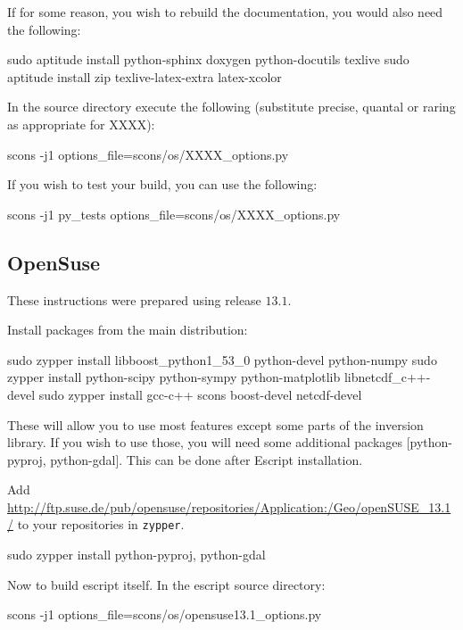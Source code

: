 \begin{optionalstep}
If for some reason, you wish to rebuild the documentation, you would also need the following:
\begin{shellCode}
sudo aptitude install python-sphinx doxygen python-docutils texlive 
sudo aptitude install zip texlive-latex-extra latex-xcolor 
\end{shellCode}
\end{optionalstep}

\noindent In the source directory execute the following (substitute precise, quantal or raring as appropriate for XXXX):
\begin{shellCode}
scons -j1 options_file=scons/os/XXXX_options.py
\end{shellCode}

\noindent If you wish to test your build, you can use the following:
\begin{shellCode}
scons -j1 py_tests options_file=scons/os/XXXX_options.py 
\end{shellCode}



\subsection{OpenSuse}\label{sec:susesrc}
These instructions were prepared using release $13.1$.

\noindent Install packages from the main distribution:
\begin{shellCode}
sudo zypper install libboost_python1_53_0 python-devel python-numpy 
sudo zypper install python-scipy python-sympy python-matplotlib libnetcdf_c++-devel
sudo zypper install gcc-c++ scons boost-devel netcdf-devel
\end{shellCode}
These will allow you to use most features except some parts of the \downunder inversion library.
If you wish to use those, you will need some additional packages [python-pyproj, python-gdal].
This can be done after Escript installation.

\begin{optionalstep}
Add \url{http://ftp.suse.de/pub/opensuse/repositories/Application:/Geo/openSUSE_13.1/}
to your repositories in \texttt{zypper}.
\begin{shellCode}
sudo zypper install python-pyproj, python-gdal
\end{shellCode}
\end{optionalstep}

Now to build escript itself.
In the escript source directory:
\begin{shellCode}
scons -j1 options_file=scons/os/opensuse13.1_options.py
\end{shellCode}

